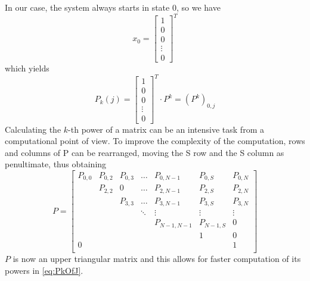In our case, the system always starts in state 0, so we have
\begin{equation*}
x_{0} = 
\begin{bmatrix}
1 \\
0 \\
0 \\
\vdots \\
0
\end{bmatrix}^{T}
\label{initialStateVector}
\end{equation*}
which yields
\begin{equation}
P_{k}(j) = 
\begin{bmatrix}
1 \\
0 \\
0 \\
\vdots \\
0
\end{bmatrix}^{T}
\cdot P^{k} = (P^{k})_{0,j}
\label{eq:PkOfJ}
\end{equation}
Calculating the $k$-th power of a matrix can be an intensive task from a
computational point of view. To improve the complexity of the computation, rows
and columns of P can be rearranged, moving the S row and the S column as
penultimate, thus obtaining
\begin{equation*}
P = 
\begin{bmatrix}
P_{0,0}	& P_{0,2}	& P_{0,3}  	& \dots	& P_{0, N-1}	& P_{0,S}	& P_{0,N} \\
		& P_{2,2}	& 0  	& \dots	& P_{2, N-1}	& P_{2,S}	& P_{2,N} \\
		& 			& P_{3,3}	& \dots	& P_{3, N-1}	& P_{3,S}	& P_{3,N} \\
 		& 			& 			& \ddots& \vdots		& \vdots	& \vdots \\
		& 			& 			& 		& P_{N-1,N-1}	& P_{N-1,S}	& 0\\
		& 			& 			& 		& 				& 1			& 0		 \\
0		& 			& 		  	& 		& 				& 			& 1		 \\
\end{bmatrix}
\label{triangularPMatrix}
\end{equation*}
$P$ is now an upper triangular matrix and this allows for faster computation of
its powers in \ref{eq:PkOfJ}.
